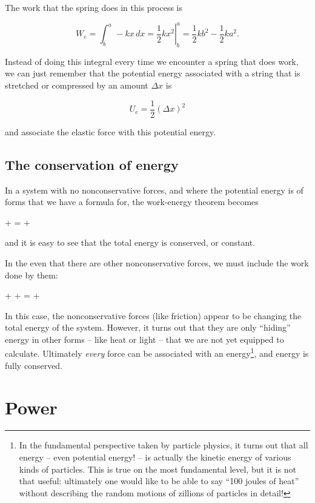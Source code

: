 \documentclass[10pt]{article}
\begin{document}
The work that the spring does in this process is 

$$W_e = \int_b^a\, -kx\, dx = \left.\frac{1}{2}kx^2\right|_b^a =\frac{1}{2}kb^2 - \frac{1}{2}ka^2.$$

Instead of doing this integral every time we encounter a spring that does work, we can just remember that the potential energy associated with a string that is stretched or compressed by an amount $\Delta x$ is 

$$U_e = \frac{1}{2}(\Delta x)^2$$

and associate the elastic force with this potential energy.

\subsection{The conservation of energy}

In a system with no nonconservative forces, and where the potential energy is of forms that we have a formula for, the work-energy theorem becomes

 +   =  + 

and it is easy to see that the total energy is conserved, or constant.

In the even that there are other nonconservative forces, we must include the work done by them:

 +  + =  + 

In this case, the nonconservative forces (like friction) appear to be changing the total energy of the system. However, it turns out that they are only ``hiding'' energy in other forms -- like heat or light -- that we are not yet equipped to calculate. Ultimately {\it every} force can be associated with an energy\footnote{In the fundamental perspective taken by particle physics, it turns out that all energy -- even potential energy! -- is actually the kinetic energy of various kinds of particles. This is true on  the most fundamental level, but it is not that useful: ultimately one would like to be able to say ``100 joules of heat'' without describing the random motions of zillions of particles in detail!}, and energy is fully conserved.

\section{Power}
\end{document}
